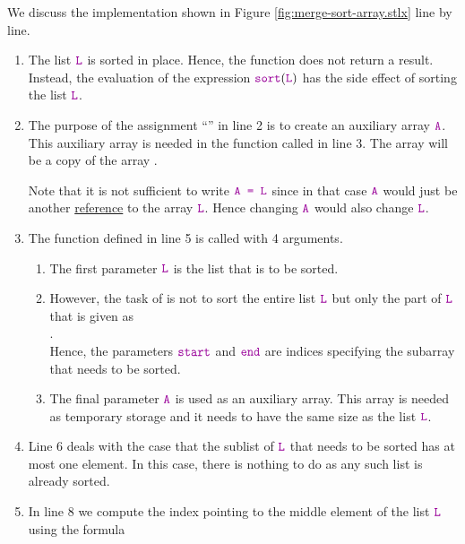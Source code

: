 We discuss the implementation shown in Figure \ref{fig:merge-sort-array.stlx} line by line.
\begin{enumerate}
\item The list $\mytt{L}$ is sorted in place. Hence, the function 
       does not return a result.  Instead, the evaluation of the expression
      $\mytt{sort}(\mytt{L})$ has the side effect of sorting the list $\mytt{L}$.
\item The purpose of the assignment ``'' in line 2 is to create an auxiliary array
      $\mytt{A}$.  This auxiliary array is needed in the function  called in line 3.
      The array  will be a copy of the array .

      Note that it is not sufficient to write $\mytt{A = L}$ since in that case $\mytt{A}$ would just
      be another \href{https://www.oreilly.com/library/view/python-in-a/0596001886/ch04s03.html}{reference} to
      the array $\mytt{L}$.  Hence changing $\mytt{A}$ would also change $\mytt{L}$. 
\item The function  defined in line 5 is called with 4 arguments.
      \begin{enumerate}
      \item The first parameter $\mytt{L}$ is the list that is to be sorted.
      \item However, the task of  is not to sort the entire list $\mytt{L}$ but only
            the part of $\mytt{L}$ that is given as
            \\[0.2cm]
            \hspace*{1.3cm} 
            . 
            \\[0.2cm]
            Hence, the parameters $\mytt{start}$ and $\mytt{end}$ are indices specifying the 
            subarray that needs to be sorted.
      \item The final parameter $\mytt{A}$ is used as an auxiliary array.  This array is needed
            as temporary storage and it needs to have the same size as the list $\mytt{L}$.
      \end{enumerate} 
\item Line 6 deals with the case that the sublist of $\mytt{L}$ that needs to be sorted has at most one element.  
      In this case, there is nothing to do as any such list is already sorted.
\item In line 8 we compute the index pointing to the middle element of the list $\mytt{L}$ using the
      formula \\[0.2cm]

\end{enumerate}
